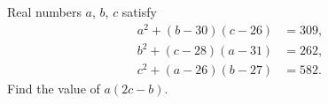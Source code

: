 Real numbers $a$, $b$, $c$ satisfy
\[\begin{aligned}
a^2+(b-30)(c-26)&=309,\\
b^2+(c-28)(a-31)&=262,\\
c^2+(a-26)(b-27)&=582.
\end{aligned}\]
Find the value of $a(2c-b)$.
